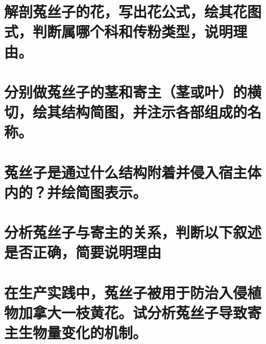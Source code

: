 \documentclass[a4paper, 12pt]{exam}
\begin{document}
\begin{questions}
    \begin{parts}
        \part{\rule{3cm}{0.2pt}}
        \part{\rule{3cm}{0.2pt}}
        \part{\rule{3cm}{0.2pt}}
        \part{\rule{3cm}{0.2pt}}
        \part{\rule{3cm}{0.2pt}}
    \end{parts}
    \begin{parts}
        \part[10]{解剖菟丝子的花，写出花公式，绘其花图式，判断属哪个科和传粉类型，说明理由。}
        \vfill
        \part[10]{分别做菟丝子的茎和寄主（茎或叶）的横切，绘其结构简图，并注示各部组成的名称。}
        \vfill
        \newpage
        \part[3]{菟丝子是通过什么结构附着并侵入宿主体内的？并绘简图表示。}
        \vfill
        \part[4]{分析菟丝子与寄主的关系，判断以下叙述是否正确，简要说明理由}
        \begin{subparts}
            \vfill
        \end{subparts}
        \part[3]{在生产实践中，菟丝子被用于防治入侵植物加拿大一枝黄花。试分析菟丝子导致寄主生物量变化的机制。}
        \vfill
        \newpage
    \end{parts}

\end{questions}
\end{document}
